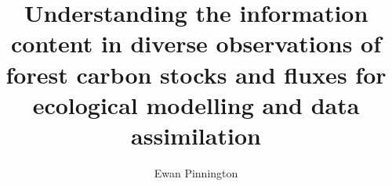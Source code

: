 \documentclass[12pt, a4paper]{report}
\title{Understanding the information content in diverse observations of forest carbon stocks and fluxes for ecological modelling and data assimilation}
\author{Ewan Pinnington}
\begin{document}
\maketitle
\tableofcontents
\listoffigures
\listoftables



\clearpage
{}
\end{document}
